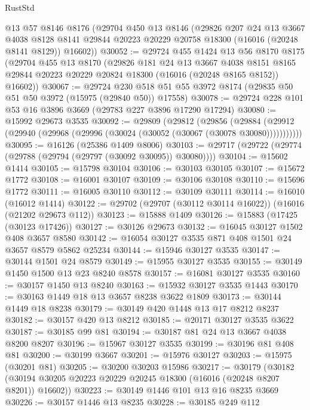 \begin{lexlean}{RustStd}
\begin{coremodule}
    @13
    @57
    @8146
    @8176
    (@29704
      @450
      @13
      @8146
      (@29826
        @207
        @24
        @13
        @3667
        @4038
        @8128
        @8141
        @29844
        @20223
        @20229
        @20758
        @18300
        (@16016 (@20248 @8141 @8129))
        @16602))
@30052 := @29724
    @455
    @1424
    @13
    @56
    @8170
    @8175
    (@29704
      @455
      @13
      @8170
      (@29826
        @181
        @24
        @13
        @3667
        @4038
        @8151
        @8165
        @29844
        @20223
        @20229
        @20824
        @18300
        (@16016 (@20248 @8165 @8152))
        @16602))
@30067 := @29724
    @230
    @518
    @51
    @55
    @3972
    @8174
    (@29835 @50 @51 @50 @3972 (@15975 (@29840 @50)) @17558)
@30078 := @29724 @228 @101 @53 @16 @3896 @3669 (@29783 @227 @3896 @17290 @17294)
@30080 := @15992 @29673 @3535
@30092 := @29809
    (@29812
      (@29856
        (@29884 (@29912 (@29940 (@29968 (@29996 (@30024 (@30052 (@30067 (@30078 @30080)))))))))))
@30095 := @16126 (@25386 @1409 @8006)
@30103 := @29717 (@29722 (@29774 (@29788 (@29794 (@29797 (@30092 @30095)) @30080))))
@30104 := @15602 @1414
@30105 := @15798 @30104
@30106 := @30103 @30105
@30107 := @15672 @1772
@30108 := @16001 @30107
@30109 := @30106 @30108
@30110 := @15696 @1772
@30111 := @16005 @30110
@30112 := @30109 @30111
@30114 := @16010 (@16012 @1414)
@30122 := @29702 (@29707 (@30112 @30114 @16022)) (@16016 (@21202 @29673 @112))
@30123 := @15888 @1409
@30126 := @15883 (@17425 (@30123 @17426))
@30127 := @30126 @29673
@30132 := @16045 @30127 @1502 @408 @3657 @8580
@30142 := @16054 @30127 @3535 @871 @408 @1501 @24 @3657 @8579 @5862 @25234
@30144 := @15946 @30127 @3535
@30147 := @30144 @1501 @24 @8579
@30149 := @15955 @30127 @3535
@30155 := @30149 @1450 @1500 @13 @23 @8240 @8578
@30157 := @16081 @30127 @3535
@30160 := @30157 @1450 @13 @8240
@30163 := @15932 @30127 @3535 @1443
@30170 := @30163 @1449 @18 @13 @3657 @8238 @3622 @1809
@30173 := @30144 @1449 @18 @8238
@30179 := @30149 @420 @1448 @13 @17 @8212 @8237
@30182 := @30157 @420 @13 @8212
@30185 := @20171 @30127 @3535 @3622
@30187 := @30185 @99 @81
@30194 := @30187 @81 @24 @13 @3667 @4038 @8200 @8207
@30196 := @15967 @30127 @3535
@30199 := @30196 @81 @408 @81
@30200 := @30199 @3667
@30201 := @15976 @30127
@30203 := @15975 (@30201 @81)
@30205 := @30200 @30203 @15986
@30217 := @30179
    (@30182 (@30194 @30205 @20223 @20229 @20245 @18300 (@16016 (@20248 @8207 @8201)) @16602))
@30223 := @30149 @1446 @101 @13 @16 @8235 @3669
@30226 := @30157 @1446 @13 @8235
@30228 := @30185 @249 @112

\end{coremodule}
\end{lexlean}
